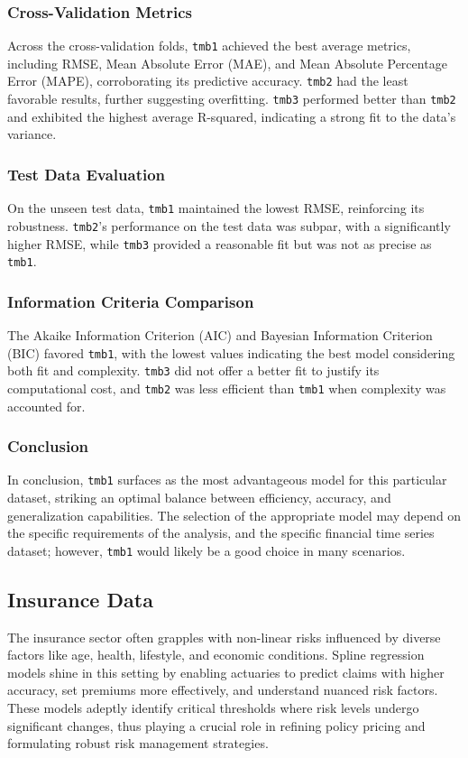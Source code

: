 \documentclass[12pt, twoside,hidelinks]{article}
\theoremstyle{definition}
\numberwithin{equation}{section}
\begin{document}
\subsubsection*{Cross-Validation Metrics}
Across the cross-validation folds, \texttt{tmb1} achieved the best average metrics, including RMSE, Mean Absolute Error (MAE), and Mean Absolute Percentage Error (MAPE), corroborating its predictive accuracy. \texttt{tmb2} had the least favorable results, further suggesting overfitting. \texttt{tmb3} performed better than \texttt{tmb2} and exhibited the highest average R-squared, indicating a strong fit to the data's variance.

\subsubsection*{Test Data Evaluation}
On the unseen test data, \texttt{tmb1} maintained the lowest RMSE, reinforcing its robustness. \texttt{tmb2}'s performance on the test data was subpar, with a significantly higher RMSE, while \texttt{tmb3} provided a reasonable fit but was not as precise as \texttt{tmb1}.

\subsubsection*{Information Criteria Comparison}
The Akaike Information Criterion (AIC) and Bayesian Information Criterion (BIC) favored \texttt{tmb1}, with the lowest values indicating the best model considering both fit and complexity. \texttt{tmb3} did not offer a better fit to justify its computational cost, and \texttt{tmb2} was less efficient than \texttt{tmb1} when complexity was accounted for.


\subsubsection*{Conclusion}

In conclusion, \texttt{tmb1} surfaces as the most advantageous model for this particular dataset, striking an optimal balance between efficiency, accuracy, and generalization capabilities. The selection of the appropriate model may depend on the specific requirements of the analysis, and the specific financial time series dataset; however, \texttt{tmb1} would likely be a good choice in many scenarios.



\subsection{Insurance Data}
The insurance sector often grapples with non-linear risks influenced by diverse factors like age, health, lifestyle, and economic conditions. Spline regression models shine in this setting by enabling actuaries to predict claims with higher accuracy, set premiums more effectively, and understand nuanced risk factors. These models adeptly identify critical thresholds where risk levels undergo significant changes, thus playing a crucial role in refining policy pricing and formulating robust risk management strategies.
\end{document}
